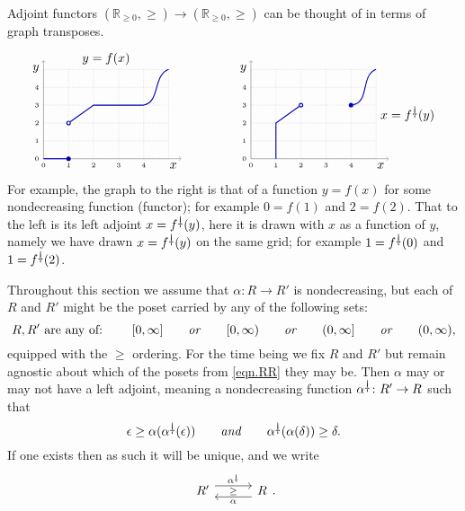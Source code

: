 \documentclass[11pt, one side, article]{memoir}
\newcommand{\adjpos}[6][30pt]{%
\begin{tikzcd}[ampersand replacement=\&, column sep=#1]
  #2\ar[r, shift left=4.5pt, "#3"]
  \ar[r, phantom, "\scriptstyle#6"]\&
  #5\ar[l, shift left=4.5pt, "#4"]
\end{tikzcd}
}
\theoremstyle{definition}
\theoremstyle{plain}
\newcommand{\ldag}{^{\rotatebox{180}{$\dagger$}}}
\newcommand{\tn}[1]{\textnormal{#1}}
\newcommand{\rr}{\mathbb{R}}
\newcommand{\hh}[2][]{#1 \tn{\textit{#2}} #1}
\newcommand{\qqand}{\hh[\qquad]{and}}
\newcommand{\rrnon}{\rr_{\geq0}}
\begin{document}
Adjoint functors $(\rrnon,\geq)\to(\rrnon,\geq)$ can be thought of in terms of graph transposes.
\[
\begin{tikzpicture}[x=.7cm, y=.5cm]
	\draw [xstep=1, ystep=1, very thin, densely dotted] (0,0) grid (5,5);
	\draw [very thin, ->] (0,0) -- (5.5, 0) node[below left] {$x$};
	\draw [very thin, ->] (0,0) -- (0, 5.5) node[below left] {$y$};
	\begin{scope}[blue!70!black, thick]
  	\node[circle, draw, inner sep=1pt, fill] at (1,0) (ccl) {};
  	\node[circle, draw, inner sep=1pt] 			 at (1,2) (cop) {};
		\draw (0,0) -- (ccl);
		\draw (cop) -- (2,3) -- (4,3) to[out=10, in=200] (5,5);
	\end{scope}
	\foreach \i in {0,..., 4} {
		\node[left, font=\tiny] at (0, \i) {\i};
		\node[below, font=\tiny] at (\i, 0) {\i};
	}
	\node[above] at (2.5, 5) {$y=f(x)$};
\end{tikzpicture}
\hspace{.6in}
\begin{tikzpicture}[x=.7cm, y=.5cm]
	\draw [xstep=1, ystep=1, very thin, densely dotted] (0,0) grid (5,5);
	\draw [very thin, ->] (0,0) -- (5.5, 0) node[below left] {$x$};
	\draw [very thin, ->] (0,0) -- (0, 5.5) node[below left] {$y$};
	\begin{scope}[blue!70!black, thick]
  	\node[circle, draw, inner sep=1pt, fill] at (4,3) (ccl) {};
  	\node[circle, draw, inner sep=1pt] 			 at (2,3) (cop) {};
		\draw (1,0) -- (1,2) -- (cop);
		\draw (ccl) to[out=10, in=200] (5,5);
	\end{scope}
	\foreach \i in {0,..., 4} {
		\node[left, font=\tiny] at (0, \i) {\i};
		\node[below, font=\tiny] at (\i, 0) {\i};
	}
	\node[right] at (5, 2.5) {$x=f\ldag(y)$};
\end{tikzpicture}
\]
For example, the graph to the right is that of a function $y=f(x)$ for some nondecreasing function (functor); for example $0=f(1)$ and $2=f(2)$. That to the left is its left adjoint $x=f\ldag(y)$, here it is drawn with $x$ as a function of $y$, namely we have drawn $x=f\ldag(y)$ on the same grid; for example $1=f\ldag(0)$ and $1=f\ldag(2)$.



Throughout this section we assume that $\alpha\colon R\to R'$ is nondecreasing, but each of $R$ and $R'$ might be the poset carried by any of the following sets:
\begin{equation}\label{eqn.RR}
	R,R'\text{~are any of:~}\qquad
	[0,\infty]\hh[\qquad]{or}
	[0,\infty)\hh[\qquad]{or}
	(0,\infty]\hh[\qquad]{or}
	(0,\infty),
\end{equation}
equipped with the $\geq$ ordering. For the time being we fix $R$ and $R'$ but remain agnostic about which of the posets from \eqref{eqn.RR} they may be. Then $\alpha$ may or may not have a left adjoint, meaning a nondecreasing function $\alpha\ldag\colon R'\to R$ such that
\begin{equation}\label{eqn.unit_counit}
  \epsilon\geq\alpha(\alpha\ldag(\epsilon))
  \qqand
  \alpha\ldag(\alpha(\delta))\geq\delta.
\end{equation}
If one exists then as such it will be unique, and we write
\[
\adjpos{R'}{\alpha\ldag}{\alpha}{R}{\geq}.
\]
\end{document}

